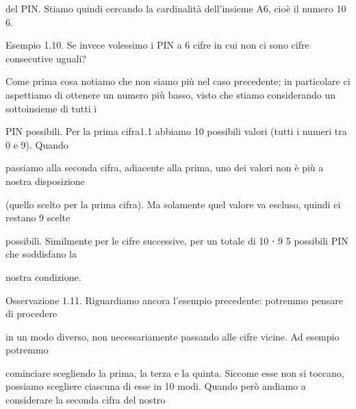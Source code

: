 \documentclass[a4paper,portrait,12pt]{article}
\begin{document}
\begin{flushleft}
del PIN. Stiamo quindi cercando la cardinalit\`{a} dell'insieme A6, cio\`{e} il numero 10 6.
\end{flushleft}


\begin{flushleft}
Esempio 1.10. Se invece volessimo i PIN a 6 cifre in cui non ci sono cifre consecutive uguali?
\end{flushleft}


\begin{flushleft}
Come prima cosa notiamo che non siamo più nel caso precedente; in particolare ci aspettiamo di ottenere un numero più basso, visto che stiamo considerando un sottoinsieme di tutti i
\end{flushleft}


\begin{flushleft}
PIN possibili. Per la prima cifra1.1 abbiamo 10 possibili valori (tutti i numeri tra 0 e 9). Quando
\end{flushleft}


\begin{flushleft}
passiamo alla seconda cifra, adiacente alla prima, uno dei valori non \`{e} più a nostra disposizione
\end{flushleft}


\begin{flushleft}
(quello scelto per la prima cifra). Ma solamente quel valore va escluso, quindi ci restano 9 scelte
\end{flushleft}


\begin{flushleft}
possibili. Similmente per le cifre successive, per un totale di 10 ⋅ 9 5 possibili PIN che soddisfano la
\end{flushleft}


\begin{flushleft}
nostra condizione.
\end{flushleft}


\begin{flushleft}
Osservazione 1.11. Riguardiamo ancora l'esempio precedente: potremmo pensare di procedere
\end{flushleft}


\begin{flushleft}
in un modo diverso, non necessariamente passando alle cifre vicine. Ad esempio potremmo
\end{flushleft}


\begin{flushleft}
cominciare scegliendo la prima, la terza e la quinta. Siccome esse non si toccano, possiamo scegliere ciascuna di esse in 10 modi. Quando per\`{o} andiamo a considerare la seconda cifra del nostro
\end{flushleft}
\end{document}
